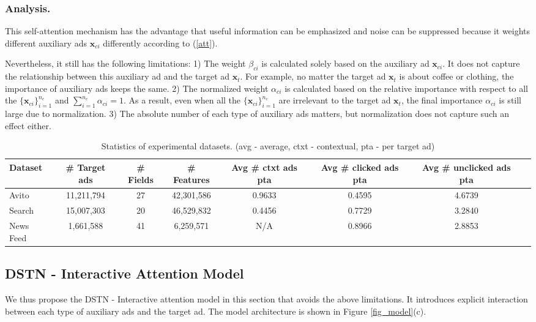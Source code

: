 \documentclass[sigconf]{acmart}
\begin{document}
\subsubsection{Analysis.}
This self-attention mechanism has the advantage that useful information can be emphasized and noise can be suppressed because it weights different auxiliary ads $\mathbf{x}_{ci}$ differently according to (\ref{att}).

Nevertheless, it still has the following limitations: 1) The weight $\beta_{ci}$ is calculated solely based on the auxiliary ad $\mathbf{x}_{ci}$. It does not capture the relationship between this auxiliary ad and the target ad $\mathbf{x}_t$. For example, no matter the target ad $\mathbf{x}_t$ is about coffee or clothing, the importance of auxiliary ads keeps the same.
2) The normalized weight $\alpha_{ci}$ is calculated based on the relative importance with respect to all the $\{\mathbf{x}_{ci}\}_{i=1}^{n_c}$ and $\sum_{i=1}^{n_c} \alpha_{ci} = 1$. As a result, even when all the $\{\mathbf{x}_{ci}\}_{i=1}^{n_c}$ are irrelevant to the target ad $\mathbf{x}_t$, the final importance $\alpha_{ci}$ is still large due to normalization. 3) The absolute number of each type of auxiliary ads matters, but normalization does not capture such an effect either.

\begin{table*}[!th]
\renewcommand{\arraystretch}{1.1}
\caption{Statistics of experimental datasets. (avg - average, ctxt - contextual, pta - per target ad)}
\vskip -8pt
\label{tab_stat}
\centering
\begin{tabular}{|l|c|c|c|c|c|c|c|}
\hline
\textbf{Dataset} & \textbf{\# Target ads} & \textbf{\# Fields} & \textbf{\# Features} & \textbf{Avg \# ctxt ads pta} & \textbf{Avg \# clicked ads pta} & \textbf{Avg \# unclicked ads pta}\\
\hline
Avito & 11,211,794 & 27 & 42,301,586 & 0.9633 & 0.4595 & 4.6739 \\
\hline
Search & 15,007,303 & 20 & 46,529,832 & 0.4456 & 0.7729 & 3.2840 \\
\hline
News Feed & 1,661,588  & 41 & 6,259,571 & N/A & 0.8966 & 2.8853 \\
\hline
\end{tabular}
\end{table*}

\subsection{DSTN - Interactive Attention Model} \label{sec_dstn}
We thus propose the DSTN - Interactive attention model in this section that avoids the above limitations.  It introduces explicit interaction between each type of auxiliary ads and the target ad. The model architecture is shown in Figure \ref{fig_model}(c).
\end{document}
